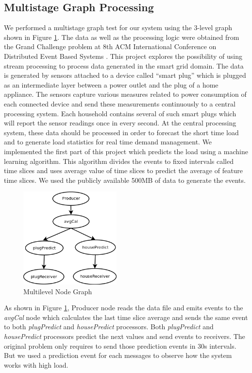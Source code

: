 \subsection{Multistage Graph Processing}
We performed a multistage graph test for our system using the 3-level graph shown in Figure \ref{multigraph}. The data as well as the processing logic were obtained from the Grand Challenge problem at 8th ACM International Conference on Distributed Event Based Systems \cite{acm}. This project explores the possibility of using stream processing to process data generated in the smart grid domain. The data is generated by sensors attached to a device called “smart plug” which is plugged as an intermediate layer between a power outlet and the plug of a home appliance. The sensors capture various measures related to power consumption of each connected device and send these measurements continuously to a central processing system. Each household contains several of such smart plugs which will report the sensor readings once in every second. At the central processing system, these data should be processed in order to forecast the short time load and to generate load statistics for real time demand management. We implemented the first part of this project which predicts the load using a machine learning algorithm. This algorithm divides the events to fixed intervals called  time slices and uses average value of time slices to predict the average of feature time slices. We used the publicly available 500MB of data to generate the events.

\begin{figure}[!t]
        \centering
        \includegraphics[width=2.0in]{multigraph.png}
        \caption{Multilevel Node Graph}
        \label{multigraph}
\end{figure}

As shown in Figure \ref{multigraph}, Producer node reads the data file and emits events to the \textit{avgCal} node which calculates the last time slice average and sends the same event to both \textit{plugPredict} and \textit{housePredict} processors. Both \textit{plugPredict} and \textit{housePredict} processors predict the next values and send events to receivers. The original problem only requires to send those prediction events in 30s intervals. But we used a prediction event for each messages to observe how the system works with high load. 

